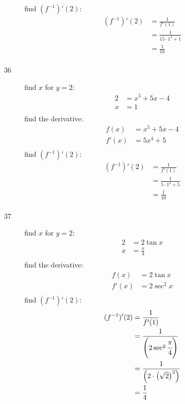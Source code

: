 \documentclass{exam}
\begin{document}
\begin{description}
find $(f^{-1})'(2)$:
\begin{align*}
  (f^{-1})'(2) &= \frac{1}{f'(1)} \\
    &= \frac{1}{15 \cdot 1^4 + 1} \\
    &= \frac{1}{16} \\
\end{align*}

\item[36]
find $x$ for $y = 2$:
\begin{align*}
  2 &= x^5 + 5x - 4 \\
  x &= 1 \\
\end{align*}
find the derivative:
\begin{align*}
  f(x) &= x^5 + 5x - 4 \\
  f'(x) &= 5x^4 + 5 \\
\end{align*}
find $(f^{-1})'(2)$:
\begin{align*}
  (f^{-1})'(2) &= \frac{1}{f'(1)} \\
    &= \frac{1}{5 \cdot 1^4 + 5} \\
    &= \frac{1}{10} \\
\end{align*}

\item[37]
find $x$ for $y = 2$:
\begin{align*}
  2 &= 2 \tan x \\
  x &= \frac{\pi}{4} \\
\end{align*}
find the derivative:
\begin{align*}
  f(x) &= 2 \tan x \\
  f'(x) &= 2 \sec^2 x \\
\end{align*}
find $(f^{-1})'(2)$:
\begin{align*}
  (f^{-1})'(2) &= \frac{1}{f'(1)} \\
    &= \frac{1}{\left( 2 \sec^2 \cfrac{\pi}{4} \right)} \\
    &= \frac{1}{\left( 2 \cdot \left( \sqrt{2} \right)^2 \right)} \\
    &= \frac{1}{4} \\
\end{align*}


\end{description}
\end{document}

